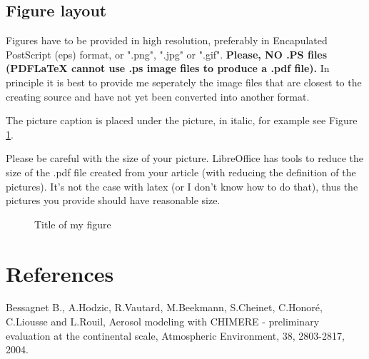 \documentclass[11pt,a4paper]{article}
\begin{document}
\subsection{Figure layout}
Figures have to be provided in high resolution, preferably in Encapulated PostScript (eps) format, or ".png", ".jpg" or ".gif". 
\textbf{Please, NO .PS files (PDFLaTeX cannot use .ps image files to produce a .pdf file).}
In principle it is best to provide me seperately the image files that are closest to the creating source and have not yet been converted into another format.

The picture caption is placed under the picture, in italic, for example see Figure \ref{fig:O3}.

Please be careful with the size of your picture. LibreOffice has tools to reduce the size of the .pdf file created from your article (with reducing the definition of the pictures). It's not the case with latex (or I don't know how to do that), thus the pictures you provide should have reasonable size.

\begin{figure}[ht] %
\begin{center}
  \centerline{
  }
\end{center}
  {\center\it\caption{\label{fig:O3}
   Title of my figure}}
\end{figure}



\section{References}


Bessagnet B., A.Hodzic, R.Vautard, M.Beekmann, S.Cheinet, C.Honor\'e, C.Liousse and L.Rouil,
Aerosol modeling with CHIMERE - preliminary evaluation at the continental scale, Atmospheric
Environment, 38, 2803-2817, 2004.



\end{document}
